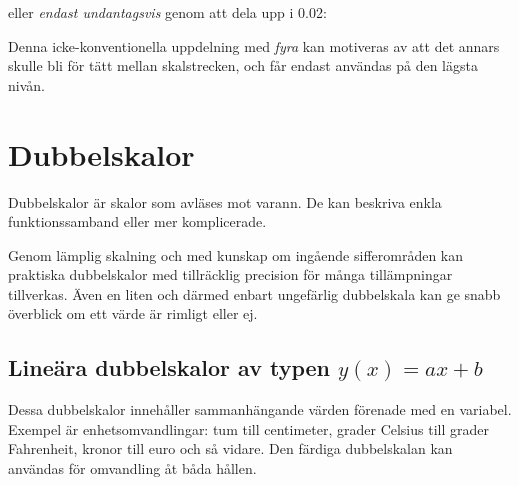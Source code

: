 \documentclass[oneside,11pt,a4paper,swedish]{scrbook}
\begin{document}
 eller \emph{endast undantagsvis} genom att dela upp i 0.02:
 
\begin{center}
\end{center}

Denna icke-konventionella uppdelning med \emph{fyra} kan motiveras av att det annars skulle bli för tätt mellan skalstrecken, och får endast användas på den lägsta nivån.


\chapter{Dubbelskalor}
Dubbelskalor är skalor som avläses mot varann. De kan beskriva enkla funktionssamband eller mer komplicerade.

Genom lämplig skalning och med kunskap om ingående sifferområden kan praktiska dubbelskalor med tillräcklig precision för många tillämpningar tillverkas. Även en liten och därmed enbart ungefärlig dubbelskala kan ge snabb överblick om ett värde är rimligt eller ej.

\section{Lineära dubbelskalor av typen $y(x)=ax+b$}
Dessa dubbelskalor innehåller sammanhängande värden förenade med en variabel. Exempel är  enhetsomvandlingar: tum till centimeter, grader Celsius till grader Fahrenheit, kronor till euro och så vidare. Den färdiga dubbelskalan kan användas för omvandling åt båda hållen.
\end{document}
